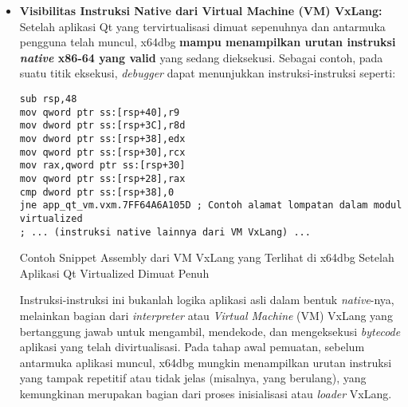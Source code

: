 \begin{itemize}
    \item \textbf{Visibilitas Instruksi Native dari Virtual Machine (VM) VxLang:} Setelah aplikasi Qt yang tervirtualisasi dimuat sepenuhnya dan antarmuka pengguna telah muncul, x64dbg \textbf{mampu menampilkan urutan instruksi \textit{native} x86-64 yang valid} yang sedang dieksekusi. Sebagai contoh, pada suatu titik eksekusi, \textit{debugger} dapat menunjukkan instruksi-instruksi seperti:
    \begin{listing}[H]
        \begin{verbatim}
sub rsp,48
mov qword ptr ss:[rsp+40],r9
mov dword ptr ss:[rsp+3C],r8d
mov dword ptr ss:[rsp+38],edx
mov qword ptr ss:[rsp+30],rcx
mov rax,qword ptr ss:[rsp+30]
mov qword ptr ss:[rsp+28],rax
cmp dword ptr ss:[rsp+38],0
jne app_qt_vm.vxm.7FF64A6A105D ; Contoh alamat lompatan dalam modul virtualized
; ... (instruksi native lainnya dari VM VxLang) ...
        \end{verbatim}
        \caption{Contoh Snippet Assembly dari VM VxLang yang Terlihat di x64dbg Setelah Aplikasi Qt Virtualized Dimuat Penuh}
        \label{lst:asm_dynamic_qt_vm_loaded_revised}
    \end{listing}
    Instruksi-instruksi ini bukanlah logika aplikasi asli dalam bentuk \textit{native}-nya, melainkan bagian dari \textit{interpreter} atau \textit{Virtual Machine} (VM) VxLang yang bertanggung jawab untuk mengambil, mendekode, dan mengeksekusi \textit{bytecode} aplikasi yang telah divirtualisasi. Pada tahap awal pemuatan, sebelum antarmuka aplikasi muncul, x64dbg mungkin menampilkan urutan instruksi yang tampak repetitif atau tidak jelas (misalnya,  yang berulang), yang kemungkinan merupakan bagian dari proses inisialisasi atau \textit{loader} VxLang. 


\end{itemize}
